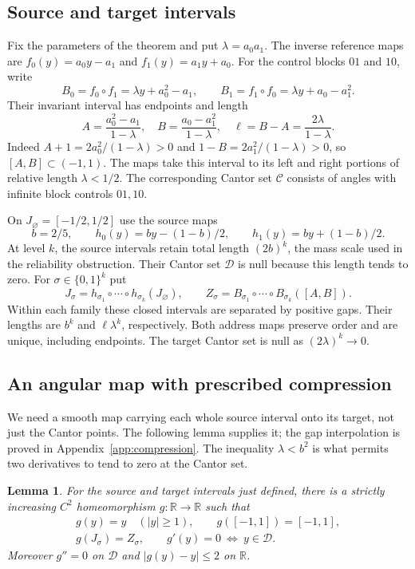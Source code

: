 \documentclass[11pt]{amsart}
\newtheorem{lemma}[theorem]{Lemma}
\theoremstyle{definition}
\theoremstyle{remark}
\newcommand{\R}{\mathbb R}
\numberwithin{equation}{section}
\begin{document}
\subsection{Source and target intervals}
Fix the parameters of the theorem and put $\lambda=a_0a_1$.
The inverse reference maps are $f_0(y)=a_0y-a_1$ and
$f_1(y)=a_1y+a_0$. For the control blocks $01$ and $10$, write
\[
B_0=f_0\circ f_1=\lambda y+a_0^2-a_1,\qquad
B_1=f_1\circ f_0=\lambda y+a_0-a_1^2.
\]
Their invariant interval has endpoints and length
\begin{equation}\label{eq:cantorendpoints}
A=\frac{a_0^2-a_1}{1-\lambda},\quad
B=\frac{a_0-a_1^2}{1-\lambda},\quad
\ell=B-A=\frac{2\lambda}{1-\lambda}.
\end{equation}
Indeed $A+1=2a_0^2/(1-\lambda)>0$ and
$1-B=2a_1^2/(1-\lambda)>0$, so $[A,B]\subset(-1,1)$.
The maps take this interval to its left and right portions of
relative length $\lambda<1/2$. The corresponding Cantor set
$\mathcal C$ consists of angles with infinite block controls $01,10$.

On $J_\varnothing=[-1/2,1/2]$ use the source maps
\[
b=2/5,\qquad h_0(y)=by-(1-b)/2,
\qquad h_1(y)=by+(1-b)/2.
\]
At level $k$, the source intervals retain total length $(2b)^k$,
the mass scale used in the reliability obstruction. Their Cantor
set $\mathcal D$ is null because this length tends to zero.
For $\sigma\in\{0,1\}^k$ put
\[
J_\sigma=h_{\sigma_1}\circ\cdots\circ h_{\sigma_k}(J_\varnothing),
\qquad Z_\sigma=B_{\sigma_1}\circ\cdots\circ B_{\sigma_k}([A,B]).
\]
Within each family these closed intervals are separated by positive
gaps. Their lengths are $b^k$ and $\ell\lambda^k$, respectively.
Both address maps preserve order and are unique, including endpoints.
The target Cantor set is null as $(2\lambda)^k\to0$.

\subsection{An angular map with prescribed compression}
We need a smooth map carrying each whole source interval onto
its target, not just the Cantor points. The following lemma supplies
it; the gap interpolation is proved in Appendix~\ref{app:compression}.
The inequality $\lambda<b^2$ is what permits two derivatives
to tend to zero at the Cantor set.

\begin{lemma}\label{lem:flatmap}
For the source and target intervals just defined, there is a
strictly increasing $C^2$ homeomorphism $g:\R\to\R$ such that
\begin{equation}\label{eq:flatmapproperties}
\begin{gathered}
g(y)=y\quad(|y|\ge1),\qquad g([-1,1])=[-1,1],\\
g(J_\sigma)=Z_\sigma,\qquad
g'(y)=0\ \Longleftrightarrow\ y\in\mathcal D.
\end{gathered}
\end{equation}
Moreover $g''=0$ on $\mathcal D$ and $|g(y)-y|\le2$ on $\R$.
\end{lemma}
\end{document}
